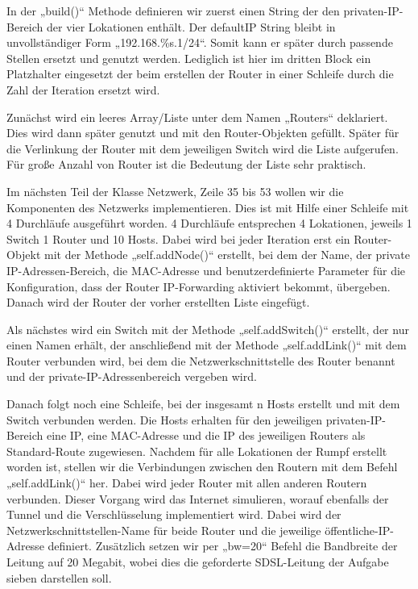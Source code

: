 \documentclass[fontsize=12pt,paper=a4,open=any,parskip=half,
  twoside=false,toc=listof,toc=bibliography,fleqn,leqno,
  captions=nooneline,captions=tableabove,british]{scrbook}
\begin{document}
In der „build()“ Methode definieren wir zuerst einen String der den privaten-IP-Bereich der vier Lokationen enthält. Der defaultIP String bleibt in unvollständiger Form „192.168.\%s.1/24“. Somit kann er später durch passende Stellen ersetzt und genutzt werden. Lediglich ist hier im dritten Block ein Platzhalter eingesetzt der beim erstellen der Router in einer Schleife durch die Zahl der Iteration ersetzt wird.
 
Zunächst wird ein leeres Array/Liste unter dem Namen „Routers“ deklariert. Dies wird dann später genutzt und mit den Router-Objekten gefüllt. Später für die Verlinkung der Router mit dem jeweiligen Switch wird die Liste aufgerufen. Für große Anzahl von Router ist die Bedeutung der Liste sehr praktisch.
 
Im nächsten Teil der Klasse Netzwerk, Zeile 35 bis 53 wollen wir die Komponenten des Netzwerks implementieren. Dies ist mit Hilfe einer Schleife mit 4 Durchläufe ausgeführt worden. 4 Durchläufe entsprechen 4 Lokationen, jeweils 1 Switch 1 Router und 10 Hosts.
Dabei wird bei jeder Iteration erst ein Router-Objekt mit der Methode „self.addNode()“ erstellt, bei dem der Name, der private IP-Adressen-Bereich, die MAC-Adresse und benutzerdefinierte Parameter für die Konfiguration, dass der Router IP-Forwarding aktiviert bekommt, übergeben. Danach wird der Router der vorher erstellten Liste eingefügt.
 
Als nächstes wird ein Switch mit der Methode „self.addSwitch()“ erstellt, der nur einen Namen erhält, der anschließend mit der Methode „self.addLink()“ mit dem Router verbunden wird, bei dem die Netzwerkschnittstelle des Router benannt und der private-IP-Adressenbereich vergeben wird.
 
Danach folgt noch eine Schleife, bei der insgesamt n Hosts erstellt und mit dem Switch verbunden werden. Die Hosts erhalten für den jeweiligen privaten-IP-Bereich eine IP, eine MAC-Adresse und die IP des jeweiligen Routers als Standard-Route zugewiesen. 
Nachdem für alle Lokationen der Rumpf erstellt worden ist, stellen wir die Verbindungen zwischen den Routern mit dem Befehl „self.addLink()“ her. Dabei wird jeder Router mit allen anderen Routern verbunden. Dieser Vorgang wird das Internet simulieren, worauf ebenfalls der Tunnel und die Verschlüsselung implementiert wird. Dabei wird der Netzwerkschnittstellen-Name für beide Router und die jeweilige öffentliche-IP-Adresse definiert. Zusätzlich setzen wir per „bw=20“ Befehl die Bandbreite der Leitung auf 20 Megabit, wobei dies die geforderte SDSL-Leitung der Aufgabe sieben darstellen soll. 
\end{document}
